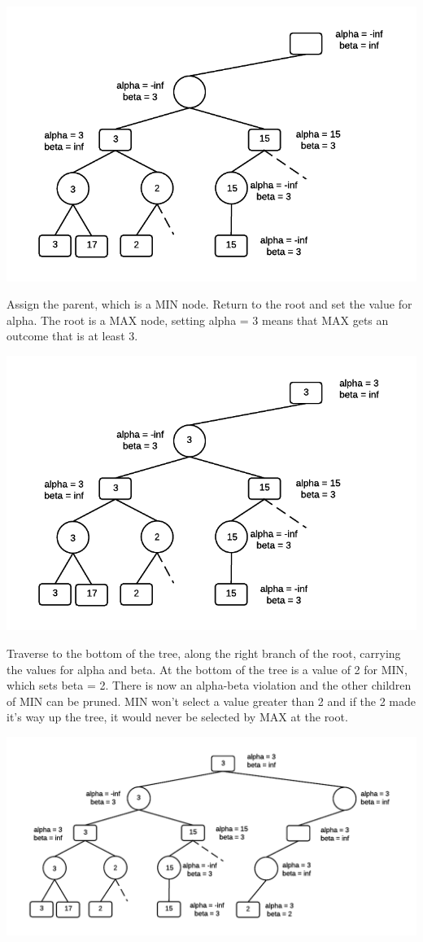 \documentclass[12pt]{article}
\makeatletter
\def\maxwidth{\ifdim\Gin@nat@width>\linewidth\linewidth
    \else\Gin@nat@width\fi}
\let\Oldincludegraphics\includegraphics
\renewcommand{\includegraphics}[1]{\Oldincludegraphics[width=.8\maxwidth]{#1}}
\makeatother
\begin{document}
\includegraphics{img/ABExample7.png}

Assign the parent, which is a MIN node. Return to the root and set the
value for alpha. The root is a MAX node, setting alpha = 3 means that
MAX gets an outcome that is at least 3.

\includegraphics{img/ABExample8.png}

Traverse to the bottom of the tree, along the right branch of the root,
carrying the values for alpha and beta. At the bottom of the tree is a
value of 2 for MIN, which sets beta = 2. There is now an alpha-beta
violation and the other children of MIN can be pruned. MIN won't select
a value greater than 2 and if the 2 made it's way up the tree, it would
never be selected by MAX at the root.

\includegraphics{img/ABExample9.png}
\end{document}
